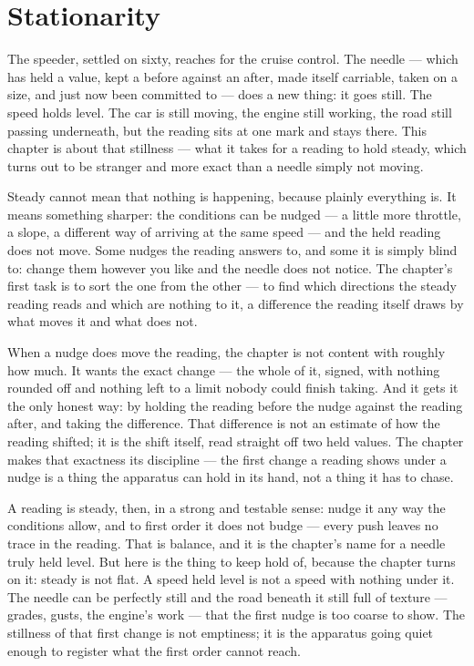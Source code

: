 \chapter{Stationarity}

The speeder, settled on sixty, reaches for the cruise control. The needle --- which has held a value, kept a before against an after, made itself carriable, taken on a size, and just now been committed to --- does a new thing: it goes still. The speed holds level. The car is still moving, the engine still working, the road still passing underneath, but the reading sits at one mark and stays there. This chapter is about that stillness --- what it takes for a reading to hold steady, which turns out to be stranger and more exact than a needle simply not moving.

Steady cannot mean that nothing is happening, because plainly everything is. It means something sharper: the conditions can be nudged --- a little more throttle, a slope, a different way of arriving at the same speed --- and the held reading does not move. Some nudges the reading answers to, and some it is simply blind to: change them however you like and the needle does not notice. The chapter's first task is to sort the one from the other --- to find which directions the steady reading reads and which are nothing to it, a difference the reading itself draws by what moves it and what does not.

When a nudge does move the reading, the chapter is not content with roughly how much. It wants the exact change --- the whole of it, signed, with nothing rounded off and nothing left to a limit nobody could finish taking. And it gets it the only honest way: by holding the reading before the nudge against the reading after, and taking the difference. That difference is not an estimate of how the reading shifted; it is the shift itself, read straight off two held values. The chapter makes that exactness its discipline --- the first change a reading shows under a nudge is a thing the apparatus can hold in its hand, not a thing it has to chase.

A reading is steady, then, in a strong and testable sense: nudge it any way the conditions allow, and to first order it does not budge --- every push leaves no trace in the reading. That is balance, and it is the chapter's name for a needle truly held level. But here is the thing to keep hold of, because the chapter turns on it: steady is not flat. A speed held level is not a speed with nothing under it. The needle can be perfectly still and the road beneath it still full of texture --- grades, gusts, the engine's work --- that the first nudge is too coarse to show. The stillness of that first change is not emptiness; it is the apparatus going quiet enough to register what the first order cannot reach.

